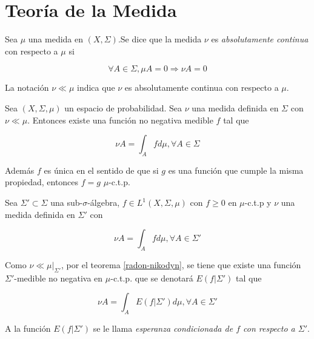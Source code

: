 \section{Teoría de la Medida}

\begin{definicion}
	Sea $\mu$ una medida en $(X,\Sigma)$.Se dice que la medida $\nu$ es \textit{absolutamente continua} con respecto a $\mu$ si
	
	\begin{equation}
		\forall A \in \Sigma, \mu A = 0 \Rightarrow \nu A = 0
	\end{equation}
	
	La notación $\nu \ll \mu$ indica que $\nu$ es absolutamente continua con respecto a $\mu$.
\end{definicion}

\begin{teorema}\label{radon-nikodyn}
	Sea $(X,\Sigma,\mu)$ un espacio de probabilidad. Sea $\nu$ una medida definida en $\Sigma$ con $\nu \ll \mu$. Entonces existe una función no negativa medible $f$ tal que
	
	\begin{equation}
		\nu A = \int_A f d\mu, \forall A \in \Sigma
	\end{equation}
	
	Además $f$ es única en el sentido de que si $g$ es una función que cumple la misma propiedad, entonces $f = g$ $\mu$-c.t.p.
\end{teorema}

\begin{definicion}
	Sea $\Sigma' \subset \Sigma$ una sub-$\sigma$-álgebra, $f \in L^1(X,\Sigma,\mu)$ con $f \geq 0$ en $\mu$-c.t.p y $\nu$ una medida definida en $\Sigma'$ con
	
	\begin{equation}
		\nu A = \int_A f d\mu, \forall A \in \Sigma'
	\end{equation}
	
	Como $\nu \ll \mu|_{\Sigma'}$, por el teorema \ref*{radon-nikodyn}, se tiene que existe una función $\Sigma'$-medible no negativa en $\mu$-c.t.p. que se denotará $E(f|\Sigma')$ tal que
	
	\begin{equation}
		\nu A = \int_A E(f|\Sigma') d\mu, \forall A \in \Sigma'
	\end{equation}
	
	A la función $E(f|\Sigma')$ se le llama \textit{esperanza condicionada de $f$ con respecto a $\Sigma'$}. 
\end{definicion}

